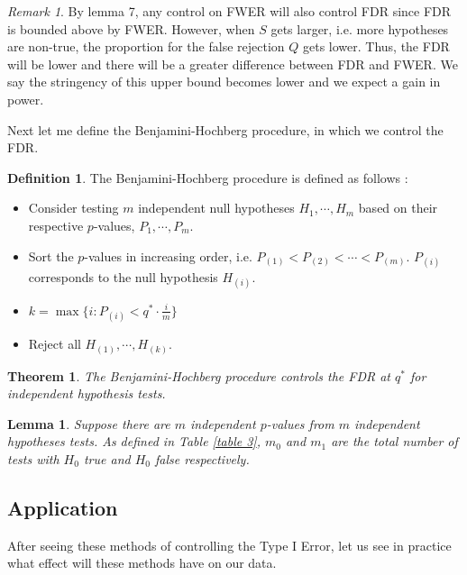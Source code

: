 \documentclass[12pt]{article}
\theoremstyle{plain}
\newtheorem{theorem}{Theorem}
\newtheorem{lemma}{Lemma}
\theoremstyle{definition}
\newtheorem{definition}{Definition}
\theoremstyle{remark}
\newtheorem*{remark}{Remark}
\begin{document}
\begin{remark}
By lemma 7, any control on FWER will also control FDR since FDR is bounded above by FWER. However, when $S$ gets larger, i.e. more hypotheses are non-true, the proportion for the false rejection $Q$ gets lower. Thus, the FDR will be lower and there will be a greater difference between FDR and FWER. We say the stringency of this upper bound becomes lower and we expect a gain in power.\cite{5.3}\cite{5.7}
\end{remark}

Next let me define the Benjamini-Hochberg procedure, in which we control the FDR.
\begin{definition}
The Benjamini-Hochberg procedure is defined as follows \cite{5.7}:
\begin{itemize}
    \item Consider testing $m$ independent null hypotheses $H_1,\cdots,H_m$ based on their respective $p$-values, $P_1,\cdots,P_m$.
    \item Sort the $p$-values in increasing order, i.e. $P_{(1)}<P_{(2)}<\cdots<P_{(m)}$. $P_{(i)}$ corresponds to the null hypothesis $H_{(i)}$.
    \item $k=\max\{i: P_{(i)}< q^*\cdot \frac{i}{m}\}$
    \item Reject all $H_{(1)},\cdots,H_{(k)}$.
\end{itemize}
\end{definition}





\begin{theorem}
The Benjamini-Hochberg procedure controls the FDR at $q^*$
for independent hypothesis tests. \cite{5.7}
\end{theorem}




\begin{lemma}\cite{5.7}
Suppose there are $m$ independent $p$-values from $m$ independent hypotheses tests. As defined in Table \ref{table 3}, $m_0$ and $m_1$ are the total number of tests with $H_0$ true and $H_0$ false respectively.
\end{lemma}


\newpage
\subsection{Application}
After seeing these methods of controlling the Type I Error, let us see in practice what effect will these methods have on our data.
\end{document}
